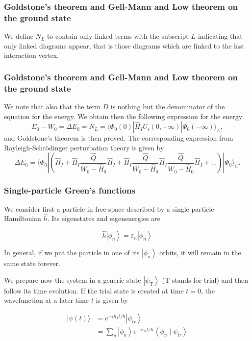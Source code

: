 \documentclass[compress]{beamer}
\newcommand*{\ket}[1]{|#1\rangle}
\newcommand*{\bra}[1]{\langle#1|}
\begin{document}
\frame
{
\frametitle{Goldstone's theorem and Gell-Mann and Low theorem on the ground state}
\begin{small}
{\scriptsize
We define  $N_L$ to contain only linked terms
with the subscript $L$ indicating that only linked diagrams appear, that is those diagrams which are linked to the last interaction vertex.
}
\end{small}
}
\frame
{
\frametitle{Goldstone's theorem and Gell-Mann and Low theorem on the ground state}
\begin{small}
{\scriptsize
We note that also that the term $D$ is nothing but the denominator of the equation for the energy. We obtain then the following expression for the energy
\[
E_0-W_0=\Delta E_0=N_L= \bra{\Phi_0(0)}\hat{H}_IU_{\epsilon}(0,-\infty )\ket{\Phi_0(-\infty)}_L,
\]
and Goldstone's theorem is then proved. 
The corresponding expression from Rayleigh-Schr\"odinger perturbation theory is given by
\[
\Delta E_0=\langle \Phi_0|\left(\hat{H}_I+\hat{H}_I\frac{\hat{Q}}{W_0-\hat{H}_0}\hat{H}_I+
\hat{H}_I\frac{\hat{Q}}{W_0-\hat{H}_0}\hat{H}_I\frac{\hat{Q}}{W_0-\hat{H}_0}\hat{H}_I+\dots\right)|\Phi_0\rangle_C.
\]
}
\end{small}
}



\frame
{
\frametitle{Single-particle Green's functions}
\begin{small}
{\scriptsize
We consider first a particle in free space described by a single particle Hamiltonian $\hat{h}$. Its eigenstates and eigenenergies are

$$
\hat{h}\left|\phi_{n}\right\rangle=\varepsilon_{n}\left|\phi_{n}\right\rangle
$$

In general, if we put the particle in one of its
$\left|\phi_{n}\right\rangle$ orbits, it will remain in the same state
forever.

We prepare now the system in a generic state
$\left|\psi_{\mathrm{T}}\right\rangle$ ($\mathrm{T}$ stands for trial) and then
follow its time evolution. If the trial state is created at time
$t=0$, the wavefunction at a later time $t$ is given by

$$
\begin{aligned}
|\psi(t)\rangle & =e^{-i h_{1} t / \hbar}\left|\psi_{t r}\right\rangle \\
& =\sum_{n}\left|\phi_{n}\right\rangle e^{-i \varepsilon_{n} t / \hbar}\left\langle\phi_{n} \mid \psi_{t r}\right\rangle
\end{aligned}
$$

}
\end{small}
}
\end{document}
